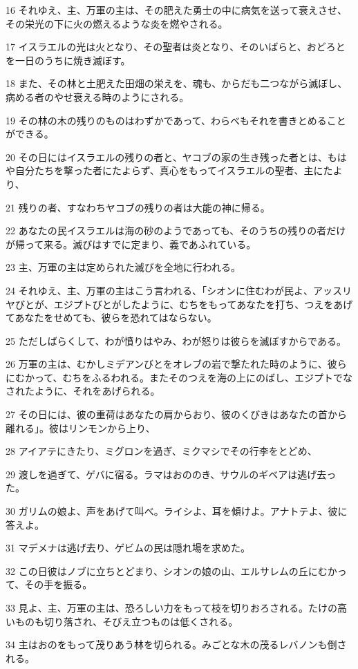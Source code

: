 \par 16 それゆえ、主、万軍の主は、その肥えた勇士の中に病気を送って衰えさせ、その栄光の下に火の燃えるような炎を燃やされる。
\par 17 イスラエルの光は火となり、その聖者は炎となり、そのいばらと、おどろとを一日のうちに焼き滅ぼす。
\par 18 また、その林と土肥えた田畑の栄えを、魂も、からだも二つながら滅ぼし、病める者のやせ衰える時のようにされる。
\par 19 その林の木の残りのものはわずかであって、わらべもそれを書きとめることができる。
\par 20 その日にはイスラエルの残りの者と、ヤコブの家の生き残った者とは、もはや自分たちを撃った者にたよらず、真心をもってイスラエルの聖者、主にたより、
\par 21 残りの者、すなわちヤコブの残りの者は大能の神に帰る。
\par 22 あなたの民イスラエルは海の砂のようであっても、そのうちの残りの者だけが帰って来る。滅びはすでに定まり、義であふれている。
\par 23 主、万軍の主は定められた滅びを全地に行われる。
\par 24 それゆえ、主、万軍の主はこう言われる、「シオンに住むわが民よ、アッスリヤびとが、エジプトびとがしたように、むちをもってあなたを打ち、つえをあげてあなたをせめても、彼らを恐れてはならない。
\par 25 ただしばらくして、わが憤りはやみ、わが怒りは彼らを滅ぼすからである。
\par 26 万軍の主は、むかしミデアンびとをオレブの岩で撃たれた時のように、彼らにむかって、むちをふるわれる。またそのつえを海の上にのばし、エジプトでなされたように、それをあげられる。
\par 27 その日には、彼の重荷はあなたの肩からおり、彼のくびきはあなたの首から離れる」。彼はリンモンから上り、
\par 28 アイアテにきたり、ミグロンを過ぎ、ミクマシでその行李をとどめ、
\par 29 渡しを過ぎて、ゲバに宿る。ラマはおののき、サウルのギベアは逃げ去った。
\par 30 ガリムの娘よ、声をあげて叫べ。ライシよ、耳を傾けよ。アナトテよ、彼に答えよ。
\par 31 マデメナは逃げ去り、ゲビムの民は隠れ場を求めた。
\par 32 この日彼はノブに立ちとどまり、シオンの娘の山、エルサレムの丘にむかって、その手を振る。
\par 33 見よ、主、万軍の主は、恐ろしい力をもって枝を切りおろされる。たけの高いものも切り落され、そびえ立つものは低くされる。
\par 34 主はおのをもって茂りあう林を切られる。みごとな木の茂るレバノンも倒される。

